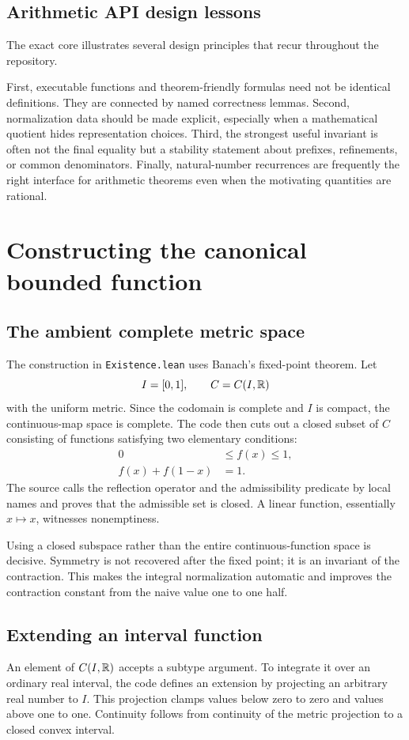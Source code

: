 \documentclass[11pt,oneside]{article}
\theoremstyle{definition}
\theoremstyle{remark}
\begin{document}
\subsection{Arithmetic API design lessons}
The exact core illustrates several design principles that recur throughout the repository.

First, executable functions and theorem-friendly formulas need not be identical definitions.  They are connected by named correctness lemmas.  Second, normalization data should be made explicit, especially when a mathematical quotient hides representation choices.  Third, the strongest useful invariant is often not the final equality but a stability statement about prefixes, refinements, or common denominators.  Finally, natural-number recurrences are frequently the right interface for arithmetic theorems even when the motivating quantities are rational.

\section{Constructing the canonical bounded function}\label{ch:existence}

\subsection{The ambient complete metric space}
The construction in \nolinkurl{Existence.lean} uses Banach's fixed-point theorem.  Let
\[
  I=[0,1],
  \qquad
  C=C(I,\mathbb{R})
\]
with the uniform metric.  Since the codomain is complete and \(I\) is compact, the continuous-map space is complete.  The code then cuts out a closed subset of \(C\) consisting of functions satisfying two elementary conditions:
\begin{align*}
  0&\leq f(x)\leq1,\\
  f(x)+f(1-x)&=1.
\end{align*}
The source calls the reflection operator and the admissibility predicate by local names and proves that the admissible set is closed.  A linear function, essentially \(x\mapsto x\), witnesses nonemptiness.

Using a closed subspace rather than the entire continuous-function space is decisive.  Symmetry is not recovered after the fixed point; it is an invariant of the contraction.  This makes the integral normalization automatic and improves the contraction constant from the naive value one to one half.

\subsection{Extending an interval function}
An element of \(C(I,\mathbb{R})\) accepts a subtype argument.  To integrate it over an ordinary real interval, the code defines an extension by projecting an arbitrary real number to \(I\).  This projection clamps values below zero to zero and values above one to one.  Continuity follows from continuity of the metric projection to a closed convex interval.
\end{document}
